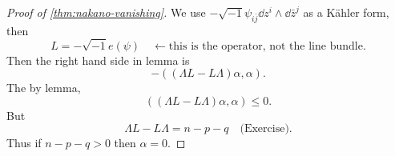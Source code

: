 \documentclass[12pt]{article}
\begin{document}
\begin{proof}[Proof of \cref{thm:nakano-vanishing}]
  We use \(-\sqrt{-1}\psi_{i\bar{j}}\dd{z^i}\wedge \dd{\bar{z}^j}\) as a Kähler
  form, then \[
    L=-\sqrt{-1}e(\psi)\quad \leftarrow\text{this is the operator, not the line
      bundle}
  .\] Then the right hand side in lemma is \[
    -((\Lambda L-L\Lambda)\alpha,\alpha)
  .\] The by lemma, \[
    ((\Lambda L-L \Lambda)\alpha,\alpha)\le 0
  .\] But \[
    \Lambda L-L\Lambda=n-p-q\quad\text{(Exercise)}
  .\]  Thus if \(n-p-q>0\) then \(\alpha=0\).
\end{proof}
\end{document}

